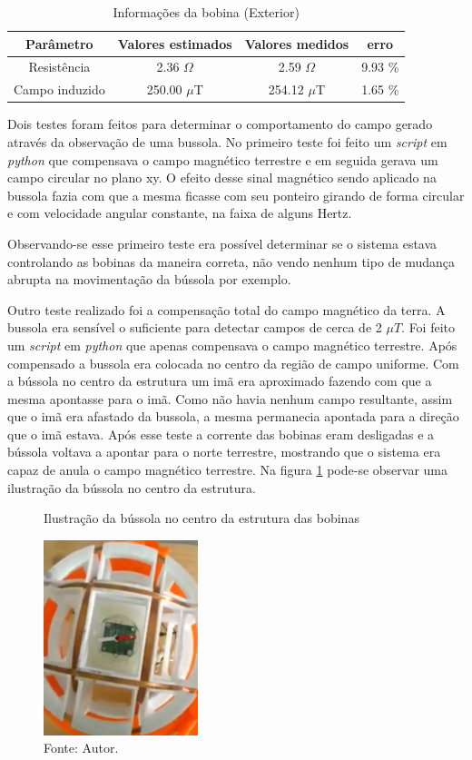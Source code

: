 \begin{table}[H]
    \centering
    \caption{Informações da bobina (Exterior)}
    \begin{tabular}{|c|c|c|c|}
     \hline
     \textbf{Parâmetro} & \textbf{Valores estimados} & \textbf{Valores medidos} & \textbf{erro}\\
     \hline
     Resistência&  2.36 $\Omega$  & 2.59 $\Omega$ & 9.93 \% \\ 
     Campo induzido &   250.00 $\mu$T  & 254.12 $\mu$T & 1.65 \% \\ \hline
     
    \end{tabular}
    \label{tab:extCoil}
\end{table}

Dois testes foram feitos para determinar o comportamento do campo gerado através da observação de uma bussola. No primeiro teste foi feito um \textit{script} em \textit{python} que compensava o campo magnético terrestre e em seguida gerava um campo circular no plano xy. O efeito desse sinal magnético sendo aplicado na bussola fazia com que a mesma ficasse com seu ponteiro girando de forma circular e com velocidade angular constante, na faixa de alguns Hertz.

Observando-se esse primeiro teste era possível determinar se o sistema estava controlando as bobinas da maneira correta, não vendo nenhum tipo de mudança abrupta na movimentação da bússola por exemplo.

Outro teste realizado foi a compensação total do campo magnético da terra. A bussola era sensível o suficiente para detectar campos de cerca de 2 $\mu T$. Foi feito um \textit{script} em \textit{python} que apenas compensava o campo magnético terrestre. Após compensado a bussola era colocada no centro da região de campo uniforme. Com a bússola no centro da estrutura um imã era aproximado fazendo com que a mesma apontasse para o imã. Como não havia nenhum campo resultante, assim que o imã era afastado da bussola, a mesma permanecia apontada para a direção que o imã estava. Após esse teste a corrente das bobinas eram desligadas e a bússola voltava a apontar para o norte terrestre, mostrando que o sistema era capaz de anula o campo magnético terrestre. Na figura \ref{fig:compass} pode-se observar uma ilustração da bússola no centro da estrutura.


\begin{figure}[H]
    \centering
     \caption{Ilustração da bússola no centro da estrutura das bobinas}
     \includegraphics[width=0.4\textwidth]{./img/compass.png}
     \caption*{Fonte: Autor.}\label{fig:compass}
\end{figure}